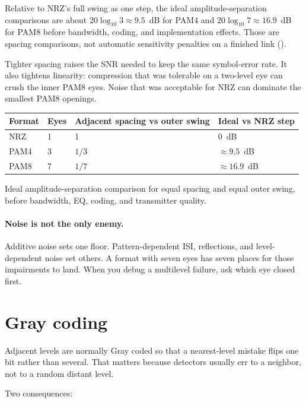 Relative to NRZ's full swing as one step, the ideal amplitude-separation
comparisons are about \(20\log_{10}3\approx9.5\)~dB for PAM4 and
\(20\log_{10}7\approx16.9\)~dB for PAM8 before bandwidth, coding, and
implementation effects. Those are spacing comparisons, not automatic
sensitivity penalties on a finished link
().

Tighter spacing raises the SNR needed to keep the same symbol-error rate. It
also tightens linearity: compression that was tolerable on a two-level eye can
crush the inner PAM8 eyes. Noise that was acceptable for NRZ can dominate the
smallest PAM8 openings.

\begin{center}
\footnotesize
\begin{tabular}{@{}llll@{}}
\toprule
Format & Eyes & Adjacent spacing vs outer swing & Ideal vs NRZ step \\
\midrule
NRZ & 1 & 1 & 0~dB \\
PAM4 & 3 & $1/3$ & $\approx9.5$~dB \\
PAM8 & 7 & $1/7$ & $\approx16.9$~dB \\
\bottomrule
\end{tabular}
\end{center}

{\raggedright\footnotesize Ideal amplitude-separation comparison for equal
spacing and equal outer swing, before bandwidth, EQ, coding, and transmitter
quality.\par}

\paragraph{Noise is not the only enemy.}
Additive noise sets one floor. Pattern-dependent ISI, reflections, and
level-dependent noise set others. A format with seven eyes has seven places for
those impairments to land. When you debug a multilevel failure, ask which eye
closed first.

\section{Gray coding}
\label{sec:multilevel-gray}

Adjacent levels are normally Gray coded so that a nearest-level mistake flips
one bit rather than several. That matters because detectors usually err to a
neighbor, not to a random distant level.

Two consequences:

